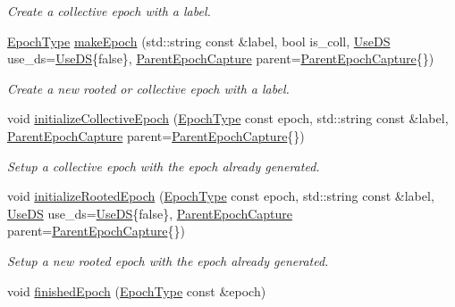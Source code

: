 \begin{DoxyCompactItemize}
\begin{DoxyCompactList}\small\item\em Create a collective epoch with a label. \end{DoxyCompactList}\item 
\hyperlink{namespacevt_a985a5adf291c34a3ca263b3378388236}{Epoch\+Type} \hyperlink{structvt_1_1term_1_1_termination_detector_a48d9022d6bb4ff56e42ebefebe1a0586}{make\+Epoch} (std\+::string const \&label, bool is\+\_\+coll, \hyperlink{structvt_1_1term_1_1_use_d_s}{Use\+DS} use\+\_\+ds=\hyperlink{structvt_1_1term_1_1_use_d_s}{Use\+DS}\{false\}, \hyperlink{structvt_1_1term_1_1_parent_epoch_capture}{Parent\+Epoch\+Capture} parent=\hyperlink{structvt_1_1term_1_1_parent_epoch_capture}{Parent\+Epoch\+Capture}\{\})
\begin{DoxyCompactList}\small\item\em Create a new rooted or collective epoch with a label. \end{DoxyCompactList}\item 
void \hyperlink{structvt_1_1term_1_1_termination_detector_af3ca1bd9f84308f910e6c1de4b8735e6}{initialize\+Collective\+Epoch} (\hyperlink{namespacevt_a985a5adf291c34a3ca263b3378388236}{Epoch\+Type} const epoch, std\+::string const \&label, \hyperlink{structvt_1_1term_1_1_parent_epoch_capture}{Parent\+Epoch\+Capture} parent=\hyperlink{structvt_1_1term_1_1_parent_epoch_capture}{Parent\+Epoch\+Capture}\{\})
\begin{DoxyCompactList}\small\item\em Setup a collective epoch with the epoch already generated. \end{DoxyCompactList}\item 
void \hyperlink{structvt_1_1term_1_1_termination_detector_a3148e617fe8edb264c6c709a5abf6199}{initialize\+Rooted\+Epoch} (\hyperlink{namespacevt_a985a5adf291c34a3ca263b3378388236}{Epoch\+Type} const epoch, std\+::string const \&label, \hyperlink{structvt_1_1term_1_1_use_d_s}{Use\+DS} use\+\_\+ds=\hyperlink{structvt_1_1term_1_1_use_d_s}{Use\+DS}\{false\}, \hyperlink{structvt_1_1term_1_1_parent_epoch_capture}{Parent\+Epoch\+Capture} parent=\hyperlink{structvt_1_1term_1_1_parent_epoch_capture}{Parent\+Epoch\+Capture}\{\})
\begin{DoxyCompactList}\small\item\em Setup a new rooted epoch with the epoch already generated. \end{DoxyCompactList}\item 
void \hyperlink{structvt_1_1term_1_1_termination_detector_ad54d75c50bd3f34f30247817737bc303}{finished\+Epoch} (\hyperlink{namespacevt_a985a5adf291c34a3ca263b3378388236}{Epoch\+Type} const \&epoch)

\end{DoxyCompactItemize}
